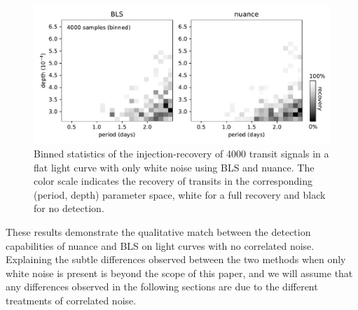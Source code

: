 \documentclass[modern]{aastex631}
\newcommand{\nuancecode}{\textsf{nuance}}
\begin{document}
\begin{figure}[H]
    \begin{centering}
        \includegraphics[width=\linewidth]{../workflows/control_test_bls/figures/control_test.pdf}
        \caption{Binned statistics of the injection-recovery of 4000 transit signals in a flat light curve with only white noise using BLS and \nuancecode{}. The color scale indicates the recovery of transits in the corresponding (period, depth) parameter space, white for a full recovery and black for no detection.}
        \label{fig:control}
    \end{centering}
\end{figure}

These results demonstrate the qualitative match between the detection capabilities of \textsf{nuance} and BLS on light curves with no correlated noise. Explaining the subtle differences observed between the two methods when only white noise is present is beyond the scope of this paper, and we will assume that any differences observed in the following sections are due to the different treatments of correlated noise.

\newpage
\end{document}
